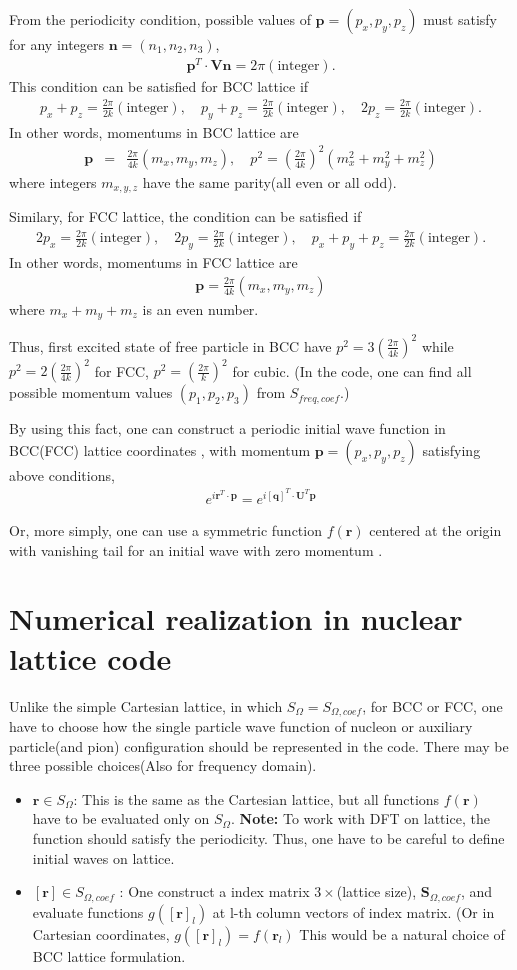 \documentclass[10pt]{book}
\def\bm{\boldsymbol}
\newcommand{\bea}{\begin{eqnarray}}
\newcommand{\eea}{\end{eqnarray}}
\def\vr{{\bm r}}
\begin{document}
From the periodicity condition, possible values of
${\bm p}=(p_x,p_y,p_z)$ must satisfy for any integers ${\bm n}=(n_1,n_2,n_3)$,
\bea 
{\bm p}^T \cdot {\bm V}{\bm n}=2\pi(\mbox{integer}).
\eea 
This condition can be satisfied for BCC lattice if 
\bea 
p_x+p_z=\frac{2\pi}{2k}(\mbox{integer}),\quad 
p_y+p_z=\frac{2\pi}{2k}(\mbox{integer}),\quad 2 p_z=\frac{2\pi}{2k}(\mbox{integer}).
\eea 
In other words, momentums in BCC lattice are 
\bea 
{\bm p}&=&\frac{2\pi}{4k}(m_x,m_y,m_z), \quad 
p^2=(\frac{2\pi}{4k})^2(m_x^2+m_y^2+m_z^2)
\eea 
where integers $m_{x,y,z}$ have the same parity(all even or all odd). 

Similary, for FCC lattice, the condition can be satisfied if
\bea 
2p_x=\frac{2\pi}{2k}(\mbox{integer}),\quad 
2p_y=\frac{2\pi}{2k}(\mbox{integer}),\quad 
p_x+p_y+p_z=\frac{2\pi}{2k}(\mbox{integer}).
\eea 
In other words, momentums in FCC lattice are 
\bea 
{\bm p}=\frac{2\pi}{4k}(m_x,m_y,m_z)
\eea 
where $m_x+m_y+m_z$ is an even number. 

Thus, first excited state of free particle in BCC have  
$p^2=3(\frac{2\pi}{4k})^2$ while 
$p^2=2(\frac{2\pi}{4k})^2$  for FCC, $p^2=(\frac{2\pi}{k})^2$ for cubic. 
(In the code, one can find all possible momentum values $(p_1,p_2,p_3)$
from $S_{freq,coef}$.)

By using this fact, one can construct 
a periodic initial wave function in BCC(FCC) lattice
coordinates , with momentum 
${\bm p}=(p_x,p_y,p_z)$ satisfying above conditions,
\bea 
e^{i{\bm r}^T \cdot {\bm p} }=e^{i [{\bm q}]^T \cdot{\bm U}^T{\bm p} }
\eea 
 
Or, more simply, one can use a symmetric function $f(\vr)$ centered at the origin
with vanishing tail for an initial wave with zero momentum .

\chapter{Numerical realization in nuclear lattice code} 
Unlike the simple Cartesian lattice, in which $S_\Omega=S_{\Omega,coef}$,
for BCC or FCC, one have to choose how the single particle wave function of nucleon or 
auxiliary particle(and pion) configuration should be represented 
in the code. There may be three possible choices(Also for frequency domain).
\begin{itemize}
	\item ${\bm r}\in S_{\Omega}$: This is the same as the Cartesian lattice, 
	                               but all functions $f({\bm r})$
	                               have to be evaluated only on $S_{\Omega}$. 	                               
	      {\bf Note:} To work with DFT on lattice, the function should satisfy the periodicity.
	                  Thus, one have to be careful to define initial waves on lattice.    	                               
	\item $[{\bm r}]\in S_{\Omega,coef}$ : One construct a index matrix $3\times$({lattice size}), 
	       ${\bm S}_{\Omega,coef}$, and evaluate functions $g([{\bm r}]_l)$
	       at l-th column vectors of index matrix. (Or in Cartesian coordinates, $g([{\bm r}]_l)=f(\vr_l)$ 
	       This would be a natural choice of BCC lattice formulation.
\end{itemize}
  
\end{document}
